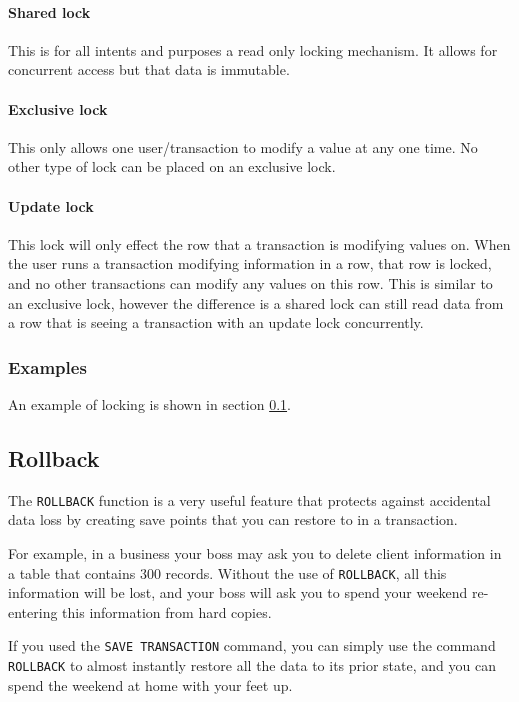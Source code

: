 \documentclass[11pt,a4paper]{scrartcl}
\begin{document}
	\paragraph{Shared lock}
	
	This is for all intents and purposes a read only locking mechanism. It allows for concurrent access but that data is immutable.
	
	\paragraph{Exclusive lock}
	
	This only allows one user/transaction to modify a value at any one time. No other type of lock can be placed on an exclusive lock.
	
	\paragraph{Update lock}
	
	This lock will only effect the row that a transaction is modifying values on. When the user runs a transaction modifying information in a row, that row is locked, and no other transactions can modify any values on this row. This is similar to an exclusive lock, however the difference is a shared lock can still read data from a row that is seeing a transaction with an update lock concurrently.
	
	\subsubsection*{Examples}
	
	An example of locking is shown in section \ref{rollback}.
	
	\subsection{Rollback}\label{rollback}
	
	The \texttt{ROLLBACK} function is a very useful feature that protects against accidental data loss by creating save points that you can restore to in a transaction.
	
	For example, in a business your boss may ask you to delete client information in a table that contains 300 records. Without the use of \texttt{ROLLBACK}, all this information will be lost, and your boss will ask you to spend your weekend re-entering this information from hard copies.
	
	If you used the \texttt{SAVE TRANSACTION} command, you can simply use the command \texttt{ROLLBACK} to almost instantly restore all the data to its prior state, and you can spend the weekend at home with your feet up.
	
\end{document}
